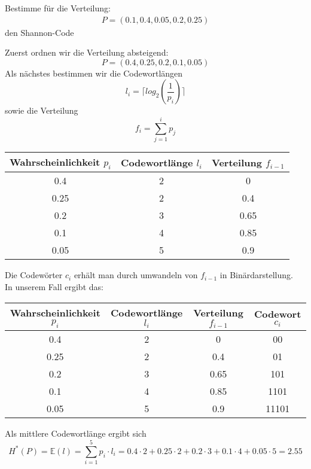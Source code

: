 \begin{uebsp}
\begin{Exercise}[label=ex:10.3]
Bestimme für die Verteilung: 
\begin{align}
P = (0.1, 0.4, 0.05, 0.2, 0.25)
\end{align}
den Shannon-Code
\end{Exercise}
\begin{Answer}
Zuerst ordnen wir die Verteilung absteigend:\\
\[P = (0.4, 0.25, 0.2, 0.1, 0.05)\]
Als nächstes bestimmen wir die Codewortlängen 
\[l_i = \lceil log_2(\frac{1}{p_i}) \rceil\]
sowie die Verteilung 
\[f_i = \sum_{j=1}^{i} p_j\]
\begin{center}
\begin{tabular}{|c|c|c|}
\hline Wahrscheinlichkeit $p_i$ & Codewortlänge $l_i$ & Verteilung $f_{i-1}$ \\ 
\hline 0.4 & 2 & 0 \\ 
\hline 0.25 & 2 & 0.4 \\ 
\hline 0.2 & 3 & 0.65 \\ 
\hline 0.1 & 4 & 0.85 \\ 
\hline 0.05 & 5 & 0.9 \\ 
\hline 
\end{tabular}
\end{center}
Die Codewörter $c_i$ erhält man durch umwandeln von $f_{i-1}$ in Binärdarstellung.\\
In unserem Fall ergibt das:
\begin{center}
\begin{tabular}{|c|c|c|c|}
\hline Wahrscheinlichkeit $p_i$ & Codewortlänge $l_i$ & Verteilung $f_{i-1}$ & Codewort $c_i$\\ 
\hline 0.4 & 2 & 0 & 00\\ 
\hline 0.25 & 2 & 0.4 & 01\\ 
\hline 0.2 & 3 & 0.65 & 101\\ 
\hline 0.1 & 4 & 0.85 & 1101\\ 
\hline 0.05 & 5 & 0.9 & 11101\\ 
\hline 
\end{tabular}
\end{center}
Als mittlere Codewortlänge ergibt sich 
\[H^*(P)=\mathbb{E}(l) = \sum_{i=1}^{5}p_i\cdot l_i = 0.4\cdot 2+0.25\cdot 2+0.2\cdot 3+0.1\cdot 4+0.05\cdot 5 = 2.55\]
\end{Answer}
\end{uebsp}

